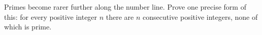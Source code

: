 Primes become rarer further along the number line. Prove one precise form of this: for every positive integer $n$ there are $n$ consecutive positive integers, none of which is prime.
